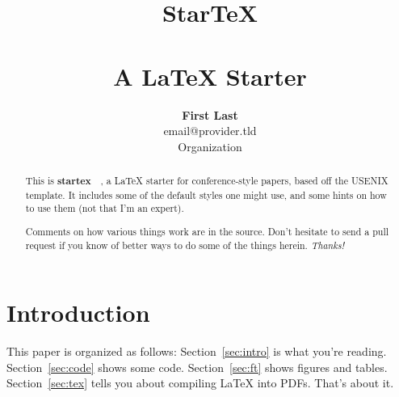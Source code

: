 \documentclass[letterpaper,twocolumn,10pt,final]{article}
\begin{document}
\date{}

\title{\selectfont
    {\huge{\textbf{StarTeX}}}\\
    {\large{\textbf{\\A LaTeX Starter}}}}


\author{
{\rm \textbf{First Last}}\\
{\rm email@provider.tld}\\
Organization\\
} %

\maketitle

\thispagestyle{empty}

\begin{abstract}
This is \textbf{startex}~\cite{startex}~, a LaTeX starter for conference-style papers, based off the USENIX template. It includes some of the default styles one might use, and some hints on how to use them (not that I'm an expert).

Comments on how various things work are in the source. Don't hesitate to send a pull request if you know of better ways to do some of the things herein. \textit{Thanks!}
\end{abstract}



\section{\label{sec:intro}Introduction}
This paper is organized as follows: Section~\ref{sec:intro} is what you're reading. Section~\ref{sec:code} shows some code. Section~\ref{sec:ft} shows figures and tables. Section~\ref{sec:tex} tells you about compiling LaTeX into PDFs. That's about it.
\end{document}
